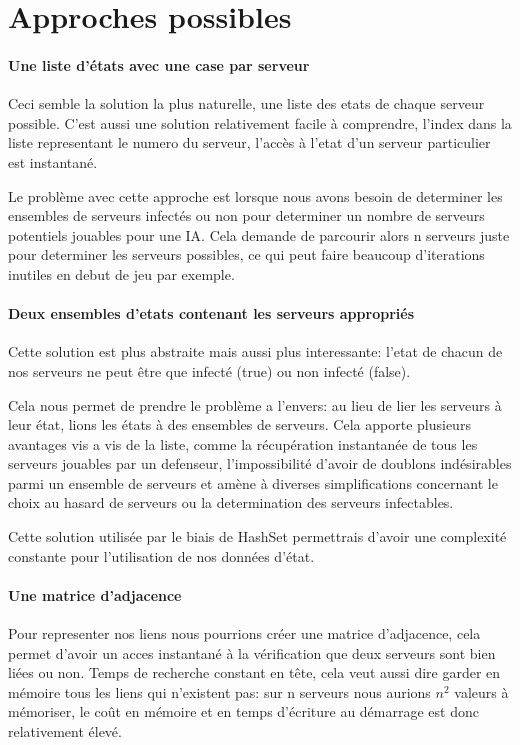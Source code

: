 \documentclass{scrreprt}
\begin{document}
    \section{Approches possibles}

    \paragraph{Une liste d'états avec une case par serveur}
    Ceci semble la solution la plus naturelle, une liste des etats de chaque
    serveur possible.
    C'est aussi une solution relativement facile à
    comprendre, l'index dans la liste representant le numero du serveur,
    l'accès à l'etat d'un serveur particulier est instantané.

    Le problème avec cette approche est lorsque nous avons besoin de
    determiner les ensembles de serveurs infectés ou non pour determiner un
    nombre de serveurs potentiels jouables pour une IA.
    Cela demande de parcourir alors n serveurs juste pour determiner les
    serveurs possibles, ce qui peut faire beaucoup d'iterations inutiles en
    debut de jeu par exemple.


    \paragraph{Deux ensembles d'etats contenant les serveurs appropriés}
    Cette solution est plus abstraite mais aussi plus interessante: l'etat de
    chacun de nos serveurs ne peut être que infecté (true) ou non infecté
    (false).

    Cela nous permet de prendre le problème a l'envers: au lieu de lier les
    serveurs à leur état, lions les états à des ensembles de serveurs.
    Cela apporte plusieurs avantages vis a vis de la liste, comme la
    récupération instantanée de tous les serveurs jouables par un defenseur,
    l'impossibilité d'avoir de doublons indésirables parmi un ensemble de
    serveurs et amène à diverses simplifications concernant le choix au
    hasard de serveurs ou la determination des serveurs infectables.

    Cette solution utilisée par le biais de HashSet permettrais d'avoir une
    complexité constante pour l'utilisation de nos données d'état.



    \paragraph{Une matrice d'adjacence}
    Pour representer nos liens nous pourrions créer une matrice d'adjacence,
    cela permet d'avoir un acces instantané à la vérification que deux
    serveurs sont bien liées ou non.
    Temps de recherche constant en tête, cela veut aussi dire garder en
    mémoire tous les liens qui n'existent pas: sur n serveurs nous
    aurions $n^{2}$ valeurs à mémoriser, le coût en mémoire et en
    temps d'écriture au démarrage est donc relativement élevé.
\end{document}
